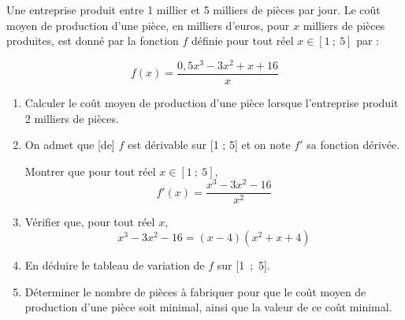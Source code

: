 \medskip

Une entreprise produit entre 1 millier et 5 milliers de pièces par jour. Le coût moyen de production d'une pièce, en milliers d'euros, pour $x$ milliers de pièces produites, est donné par la fonction $f$ définie pour tout réel $x\in[1~;~5]$ par :

\[f(x)=\dfrac{0,5x^3-3x^2+x+16}{x}\]

\begin{enumerate}
\item Calculer le coût moyen de production d'une pièce lorsque l'entreprise produit 2 milliers de pièces.
\item On admet que [de] $f$ est dérivable sur [1 ; 5] et on note $f'$ sa fonction dérivée.

 Montrer que pour tout réel $x\in[1~;~5]$, \[f'(x)=\dfrac{x^3-3x^2-16}{x^2}\]
\item Vérifier que, pour tout réel $x$, \[x^3 - 3x^2 - 16 =(x - 4)(x^2 +x + 4)\]
\item En déduire le tableau de variation de $f$ sur [1~;~5].
\item Déterminer le nombre de pièces à fabriquer pour que le coût moyen de production d'une pièce soit minimal, ainsi que la valeur de ce coût minimal.
\end{enumerate}

\vspace{0,5cm}
